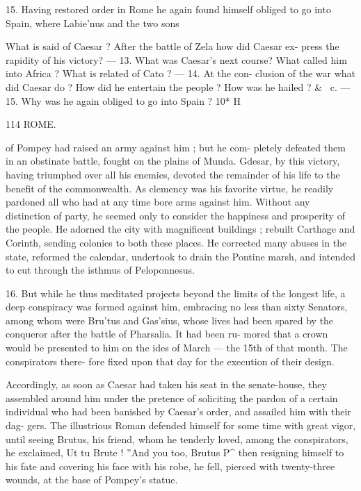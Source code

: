 \documentclass[openany,a4paper]{memoir}
\begin{document}
15. Having restored order in Rome he again found himself 
obliged to go into Spain, where Labie'nus and the two sons 

What is said of Caesar ? After the battle of Zela how did Caesar ex- 
press the rapidity of his victory? — 13. What was Caesar's next course? 
What called him into Africa ? What is related of Cato ? — 14. At the con- 
clusion of the war what did Caesar do ? How did he entertain the people ? 
How was he hailed ? \& \ c. — 15. Why was he again obliged to go into Spain ? 
10* H 



114 ROME. 

of Pompey had raised an army against him ; but he com- 
pletely defeated them in an obstinate battle, fought on the 
plains of Munda. Gdesar, by this victory, having triumphed 
over all his enemies, devoted the remainder of his life to the 
benefit of the commonwealth. As clemency was his favorite 
virtue, he readily pardoned all who had at any time bore 
arms against him. Without any distinction of party, he 
seemed only to consider the happiness and prosperity of the 
people. He adorned the city with magnificent buildings ; 
rebuilt Carthage and Corinth, sending colonies to both these 
places. He corrected many abuses in the state, reformed the 
calendar, undertook to drain the Pontine marsh, and intended 
to cut through the isthmus of Peloponnesus. 

16. But while he thus meditated projects beyond the limits 
of the longest life, a deep conspiracy was formed against him, 
embracing no less than sixty Senators, among whom were 
Bru'tus and Gas'sius, whose lives had been spared by the 
conqueror after the battle of Pharsalia. It had been ru- 
mored that a crown would be presented to him on the ides 
of March — the 15th of that month. The conspirators there- 
fore fixed upon that day for the execution of their design. 

Accordingly, as soon as Caesar had taken his seat in the 
senate-house, they assembled around him under the pretence 
of soliciting the pardon of a certain individual who had been 
banished by Caesar's order, and assailed him with their dag- 
gers. The illustrious Roman defended himself for some 
time with great vigor, until seeing Brutus, his friend, whom 
he tenderly loved, among the conspirators, he exclaimed, Ut 
tu Brute ! ''And you too, Brutus P^ then resigning himself 
to his fate and covering his face with his robe, he fell, pierced 
with twenty-three wounds, at the base of Pompey's statue. 
\end{document}
